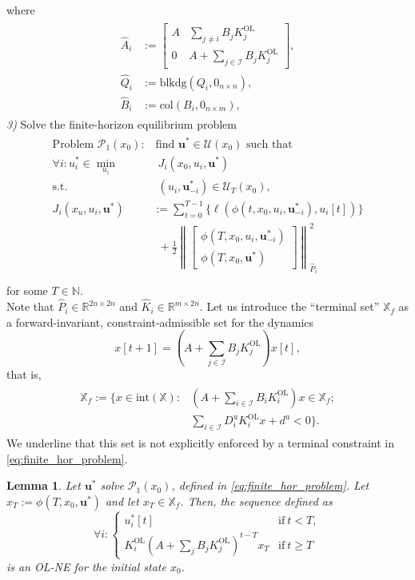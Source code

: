 \documentclass[letterpaper, 10 pt, conference]{ieeeconf}  %
\newcommand{\R}{\mathbb{R}}
\newcommand{\N}{\mathbb{N}}
\newcommand{\mc}{\mathcal}
\newcommand{\col}{\mathrm{col}}
\newcommand{\Kol}{K^{\mathrm{OL}}}
\newcommand{\bu}{\boldsymbol{u}}
\newcommand{\Du}{D^{\text{u}}}
\newcommand{\du}{d^{\text{u}}}
\newcommand{\X}{\mathbb{X}}
\newcommand{\tsum}{\textstyle\sum}
\newcommand{\blkdiag}{\mathrm{blkdg}}
\newtheorem{lemma}{Lemma}
\begin{document}
where 
\begin{align}
    \begin{split}
        \hat{A}_i &:= \begin{bmatrix}
        A & \tsum_{j\neq i} B_j \Kol_j \\
        0 & A + \tsum_{j\in\mc I} B_j \Kol_j
    \end{bmatrix}, \\
    \hat{Q}_i &:= \blkdiag(Q_i, 0_{n\times n}),\\
    \hat{B}_i &:= \col(B_i, 0_{n\times m}),
    \end{split}
\end{align}
\emph{3)} Solve the finite-horizon equilibrium problem
\begin{align} \label{eq:finite_hor_problem}
\begin{split}
\text{Problem $\mc P_1(x_0)$:}&~ \text{find $\bu^*\in\mc U(x_0)$ such that}\\ 
    \forall i: u_i^* \in \min_{u_i} & ~~J_i(x_0, u_i, \bu^*) \\
    \text{s.t.}&~~ (u_i, \bu^*_{-i})\in\mc U_T(x_0), \\
    J_i(x_u, u_i, \bu^*)&:=\sum_{t=0}^{T-1} \Big\{\ell(\phi(t, x_0, u_i, \bu^*_{-i}), u_i[t]) \Big\}\\ 
    &~~+\frac{1}{2}\left\| \begin{bmatrix}
        \phi(T, x_0, u_i, \bu^*_{-i})\\
        \phi(T, x_0, \bu^*)
    \end{bmatrix} \right\|^2_{\hat{P}_i}\\
\end{split}
\end{align}
for some $T\in\N$. \\
Note that $\hat{P}_i\in\R^{2n\times 2n}$ and $\hat{K}_i\in\R^{m\times 2n}$. Let us introduce the ``terminal set'' $\X_f$ as a forward-invariant, constraint-admissible set for the dynamics 
$$x[t+1]=(A + \tsum_{j\in\mc I} B_j \Kol_j) x[t],$$
that is,
\begin{align} \label{eq:term_set}
\begin{split}
    \X_f:=\{x\in\mathrm{int}(\X): & 
    (A + \tsum_{i\in\mc I} B_i \Kol_i) x\in\X_f; \\
    &\tsum_{i\in \mc I}\Du_i\Kol_i x +\du <0
    \}.
\end{split}  
\end{align}
We underline that this set is not explicitly enforced by a terminal constraint in \eqref{eq:finite_hor_problem}.
\begin{lemma}\cite[Theorem 1]{benenati2024linear}
    Let $\bu^*$ solve $\mc P_1(x_0)$, defined in \eqref{eq:finite_hor_problem}. Let $x_T:=\phi(T, x_0, \bu^*)$ and let $x_T\in \mathbb{X}_f$.
    Then, the sequence defined as
    \begin{equation}
        \forall i: \begin{cases}
            u_i^*[t] & \text{if} ~t < T,\\
            \Kol_i (A + \tsum_j B_j\Kol_j)^{t-T} x_T & \text{if} ~t\geq T
        \end{cases}
    \end{equation}
    is an OL-NE for the initial state $x_0$.
\end{lemma}
\end{document}
